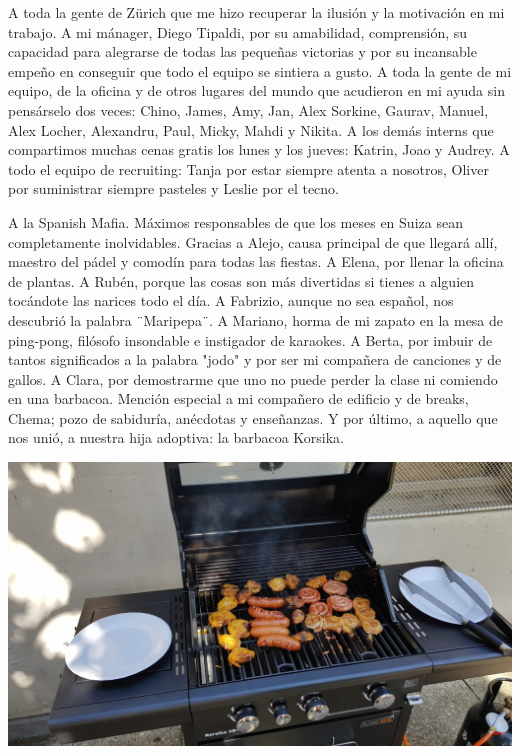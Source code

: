 A toda la gente de Zürich que me hizo recuperar la ilusión y la motivación en mi trabajo. A mi mánager, Diego Tipaldi, por su amabilidad, comprensión, su capacidad para alegrarse de todas las pequeñas victorias y por su incansable empeño en conseguir que todo el equipo se sintiera a gusto. A toda la gente de mi equipo, de la oficina y de otros lugares del mundo que acudieron en mi ayuda sin pensárselo dos veces: Chino, James, Amy, Jan, Alex Sorkine, Gaurav, Manuel, Alex Locher, Alexandru, Paul, Micky, Mahdi y Nikita. A los demás interns que compartimos muchas cenas gratis los lunes y los jueves: Katrin, Joao y Audrey. A todo el equipo de recruiting: Tanja por estar siempre atenta a nosotros, Oliver por suministrar siempre pasteles y Leslie por el tecno.

A la Spanish Mafia. Máximos responsables de que los meses en Suiza sean completamente inolvidables. Gracias a Alejo, causa principal de que llegará allí, maestro del pádel y comodín para todas las fiestas. A Elena, por llenar la oficina de plantas. A Rubén, porque las cosas son más divertidas si tienes a alguien tocándote las narices todo el día. A Fabrizio, aunque no sea español, nos descubrió la palabra ¨Maripepa¨. A Mariano, horma de mi zapato en la mesa de ping-pong, filósofo insondable e instigador de karaokes. A Berta, por imbuir de tantos significados a la palabra "jodo" y por ser mi compañera de canciones y de gallos. A Clara, por demostrarme que uno no puede perder la clase ni comiendo en una barbacoa. Mención especial a mi compañero de edificio y de breaks, Chema; pozo de sabiduría, anécdotas y enseñanzas. Y por último, a aquello que nos unió, a nuestra hija adoptiva: la barbacoa Korsika.

\begin{center}
	\includegraphics[width=0.9\linewidth]{Figures/Ack/korsika}
\end{center}

